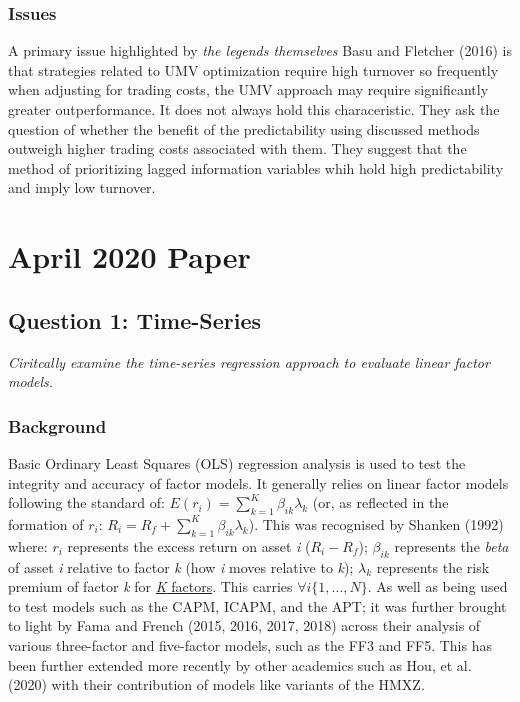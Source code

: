 \documentclass[11pt, english]{article}
\begin{document}
                \subsubsection*{Issues}
        
        A primary issue highlighted by \textit{the legends themselves} Basu and Fletcher (2016) is that strategies related to UMV optimization require high turnover so frequently when adjusting for trading costs, the UMV approach may require significantly greater outperformance. It does not always hold this characeristic. They ask the question of whether the benefit of the predictability using discussed methods outweigh higher trading costs associated with them. They suggest that the method of prioritizing lagged information variables whih hold high predictability and imply low turnover.

\newpage

\section{April 2020 Paper}

	\subsection{Question 1: Time-Series}

	\textit{Ciritcally examine the time-series regression approach to evaluate linear factor models.}

		\subsubsection*{Background}

	Basic Ordinary Least Squares (OLS) regression analysis is used to test the integrity and accuracy of factor models. It generally relies on linear factor models following the standard of: $E(r_i)=\sum_{k=1}^K\beta_{ik}\lambda_{k}$ (or, as reflected in the formation of $r_i$: $R_i=R_f+\sum_{k=1}^K\beta_{ik}\lambda_{k}$). This was recognised by Shanken (1992) where: $r_i$ represents the excess return on asset \textit{i} ($R_i-R_f$); $\beta_{ik}$ represents the \textit{beta} of asset \textit{i} relative to factor \textit{k} (how \textit{i} moves relative to \textit{k}); $\lambda_k$ represents the risk premium of factor \textit{k} for \href{https://www.tennis-warehouse.com/reviews/K61T90/K61T90review.html}{\textit{K} factors}. This carries $\forall i\{1,...,N\}$. As well as being used to test models such as the CAPM, ICAPM, and the APT; it was further brought to light by Fama and French (2015, 2016, 2017, 2018) across their analysis of various three-factor and five-factor models, such as the FF3 and FF5. This has been further extended more recently by other academics such as Hou, et al. (2020) with their contribution of models like variants of the HMXZ.\\
\end{document}
